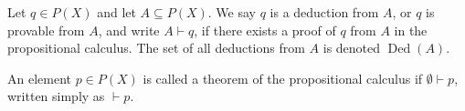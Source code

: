 Let $q \in P(X)$ and let $A \subseteq P(X)$. We say $q$ is a deduction from $A$, or $q$ is provable from $A$, and write $A \vdash q$, if there exists a proof of $q$ from $A$ in the propositional calculus. The set of all deductions from $A$ is denoted $\operatorname{Ded}(A)$.

An element $p \in P(X)$ is called a theorem of the propositional calculus if $\emptyset \vdash p$, written simply as $\vdash p$.
